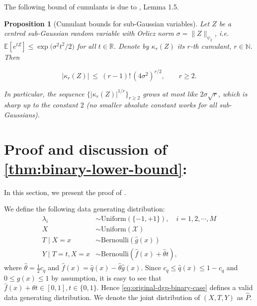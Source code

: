 \documentclass{article}
\def\gX{{\mathcal{X}}}
\newcommand{\E}{\mathbb{E}}
\newcommand{\R}{\mathbb{R}}
\newcommand{\ncref}[1]{\cref{#1}: \nameref*{#1}} %
\def\N{\mathbb{N}}
\newtheorem{proposition}{Proposition}[section]
\begin{document}
The following bound of cumulants is due to \citet{saulis2012limit}, Lemma 1.5.


\begin{proposition}[Cumulant bounds for sub-Gaussian variables]
\label{prop:cumulant-subG}
Let $Z$ be a centred sub-Gaussian random variable with Orlicz norm
$\sigma=\|Z\|_{\psi_2}$, i.e.
$\E\!\left[e^{tZ}\right]\le\exp\!\bigl(\sigma^2t^2/2\bigr)$ for all $t\in\R$.
Denote by $\kappa_r(Z)$ its $r$-th cumulant, $r\in\N$.  Then

\[
|\kappa_r(Z)|\ \le\ (r-1)!\,(4\sigma^2)^{r/2},
\qquad r\ge 2.
\]

In particular, the sequence $\{|\kappa_r(Z)|^{1/r}\}_{r\ge 2}$
grows at most like $2\sigma\sqrt{r}$, which is sharp up to the constant
$2$ (no smaller absolute constant works for all sub-Gaussians).
\end{proposition}



%
\section{Proof and discussion of \ncref{thm:binary-lower-bound}}

\label{sec:binary-lower-bound-proof}

In this section, we present the proof of  . 



We define the following data generating distribution:
\begin{equation}
    \label{eq:original-dgp-binary-case}
    \begin{aligned}
        \lambda_i &\sim \mathrm{Uniform}(\{-1,+1\}),\quad i=1,2,\cdots,M \\
        X &\sim \mathrm{Uniform}(\gX) \\
        T\mid X=x &\sim \mathrm{Bernoulli}(\hat{g}(x)) \\
        Y\mid T=t, X=x &\sim \mathrm{Bernoulli}(\hat{f}(x)+\hat{\theta}t),
    \end{aligned}
\end{equation}
where $\hat{\theta}=\frac{1}{2}c_q$ and $\hat{f}(x)=\hat{q}(x)-\hat{\theta}\hat{g}(x)$. Since $c_q \leq\hat{q}(x)\leq 1-c_q$ and $0\leq \hat{g}(x)\leq 1$ by assumption, it is easy to see that $\hat{f}(x)+\theta t \in [0,1], t\in\{0,1\}$. Hence \eqref{eq:original-dgp-binary-case} defines a valid data generating distribution. We denote the joint distribution of $(X,T,Y)$ as $\hat{P}$. 
\end{document}
